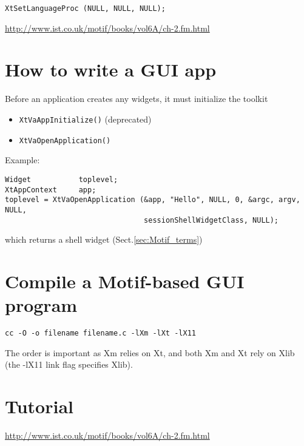\begin{verbatim}
XtSetLanguageProc (NULL, NULL, NULL);
\end{verbatim}
\url{http://www.ist.co.uk/motif/books/vol6A/ch-2.fm.html}

\section{How to write a GUI app}

Before an application creates any widgets, it must initialize the toolkit
\begin{itemize}
  \item \verb!XtVaAppInitialize()! (deprecated)
  \item \verb!XtVaOpenApplication()!
\end{itemize}
Example:
\begin{verbatim}
Widget           toplevel;
XtAppContext     app;
toplevel = XtVaOpenApplication (&app, "Hello", NULL, 0, &argc, argv, NULL,
                                sessionShellWidgetClass, NULL);    
\end{verbatim}
which returns a shell widget (Sect.\ref{sec:Motif_terms})


\section{Compile a Motif-based GUI program}

\begin{verbatim}
cc -O -o filename filename.c -lXm -lXt -lX11
\end{verbatim}
The order is important as Xm relies on Xt, and both Xm and Xt rely on Xlib (the -lX11 link flag specifies
Xlib).


\section{Tutorial}

\url{http://www.ist.co.uk/motif/books/vol6A/ch-2.fm.html}